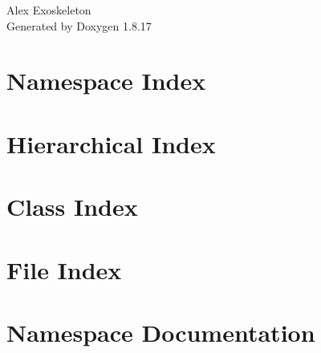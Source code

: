 \let\mypdfximage\pdfximage\def\pdfximage{\immediate\mypdfximage}\documentclass[twoside]{book}
\newcommand{\+}{\discretionary{\mbox{\scriptsize$\hookleftarrow$}}{}{}}
\newcommand{\clearemptydoublepage}{%
  \newpage{\pagestyle{empty}\cleardoublepage}%
}
\begin{document}
\hypersetup{pageanchor=false,
             bookmarksnumbered=true,
             pdfencoding=unicode
            }
\begin{titlepage}
\vspace*{7cm}
\begin{center}%
{\Large Alex Exoskeleton }\\
\vspace*{1cm}
{\large Generated by Doxygen 1.8.17}\\
\end{center}
\end{titlepage}
\clearemptydoublepage
{}
\tableofcontents
\clearemptydoublepage
{}
\hypersetup{pageanchor=true}

\chapter{Namespace Index}

\chapter{Hierarchical Index}

\chapter{Class Index}

\chapter{File Index}

\chapter{Namespace Documentation}

\end{document}
